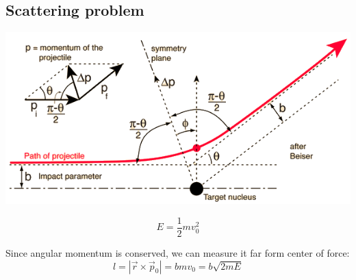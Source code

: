 \subsection{Scattering problem}
\begin{center}
	\includegraphics[width=\linewidth]{./lect18/1.png}
\end{center}

$$E = \frac{1}{2}mv_0^2$$

Since angular momentum is conserved, we can measure it far form center of force:
$$l = \left|\vec{r} \times \vec{p}_0 \right| = bmv_0 = b\sqrt{2mE}$$